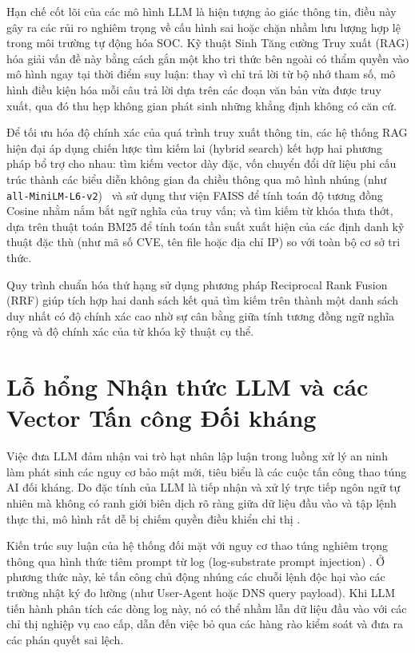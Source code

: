 Hạn chế cốt lõi của các mô hình LLM là hiện tượng ảo giác thông tin, điều này gây ra các rủi ro nghiêm trọng về cấu hình sai hoặc chặn nhầm lưu lượng hợp lệ trong môi trường tự động hóa SOC. Kỹ thuật Sinh Tăng cường Truy xuất (RAG) \cite{rag2020} hóa giải vấn đề này bằng cách gắn một kho tri thức bên ngoài có thẩm quyền vào mô hình ngay tại thời điểm suy luận: thay vì chỉ trả lời từ bộ nhớ tham số, mô hình điều kiện hóa mỗi câu trả lời dựa trên các đoạn văn bản vừa được truy xuất, qua đó thu hẹp không gian phát sinh những khẳng định không có căn cứ.

Để tối ưu hóa độ chính xác của quá trình truy xuất thông tin, các hệ thống RAG hiện đại áp dụng chiến lược tìm kiếm lai (hybrid search) kết hợp hai phương pháp bổ trợ cho nhau: tìm kiếm vector dày đặc, vốn chuyển đổi dữ liệu phi cấu trúc thành các biểu diễn không gian đa chiều thông qua mô hình nhúng (như \texttt{all-MiniLM-L6-v2})~\cite{reimers2019sentence} và sử dụng thư viện FAISS để tính toán độ tương đồng Cosine \cite{faiss2019} nhằm nắm bắt ngữ nghĩa của truy vấn; và tìm kiếm từ khóa thưa thớt, dựa trên thuật toán BM25 \cite{bm25_2009} để tính toán tần suất xuất hiện của các định danh kỹ thuật đặc thù (như mã số CVE, tên file hoặc địa chỉ IP) so với toàn bộ cơ sở tri thức.

Quy trình chuẩn hóa thứ hạng sử dụng phương pháp Reciprocal Rank Fusion (RRF) \cite{rrf2009} giúp tích hợp hai danh sách kết quả tìm kiếm trên thành một danh sách duy nhất có độ chính xác cao nhờ sự cân bằng giữa tính tương đồng ngữ nghĩa rộng và độ chính xác của từ khóa kỹ thuật cụ thể.

\section{Lỗ hổng Nhận thức LLM và các Vector Tấn công Đối kháng}

Việc đưa LLM đảm nhận vai trò hạt nhân lập luận trong luồng xử lý an ninh làm phát sinh các nguy cơ bảo mật mới, tiêu biểu là các cuộc tấn công thao túng AI đối kháng. Do đặc tính của LLM là tiếp nhận và xử lý trực tiếp ngôn ngữ tự nhiên mà không có ranh giới biên dịch rõ ràng giữa dữ liệu đầu vào và tập lệnh thực thi, mô hình rất dễ bị chiếm quyền điều khiển chỉ thị \cite{promptinjection2023}.

Kiến trúc suy luận của hệ thống đối mặt với nguy cơ thao túng nghiêm trọng thông qua hình thức tiêm prompt từ log (log-substrate prompt injection) \cite{watchtower2026}. Ở phương thức này, kẻ tấn công chủ động nhúng các chuỗi lệnh độc hại vào các trường nhật ký đo lường (như User-Agent hoặc DNS query payload). Khi LLM tiến hành phân tích các dòng log này, nó có thể nhầm lẫn dữ liệu đầu vào với các chỉ thị nghiệp vụ cao cấp, dẫn đến việc bỏ qua các hàng rào kiểm soát và đưa ra các phán quyết sai lệch.

